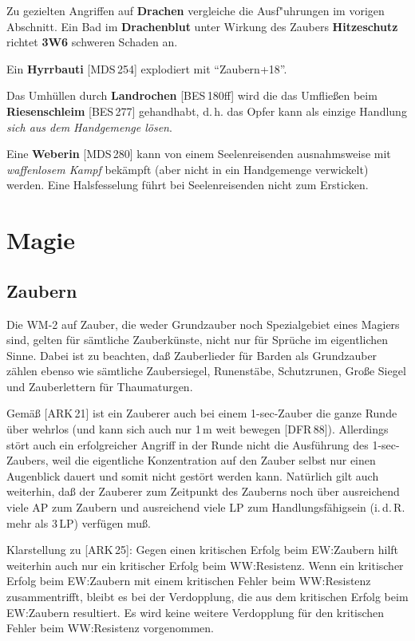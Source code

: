 \documentclass[10pt,a4paper,germanpar]{article}
\begin{document}
Zu gezielten Angriffen auf \textbf{Drachen} vergleiche die
Ausf"uhrungen im vorigen Abschnitt. Ein Bad im \textbf{Drachenblut}
unter Wirkung des Zaubers \textbf{Hitzeschutz} richtet \textbf{3W6}
schweren Schaden an.

Ein \textbf{Hyrrbauti} [MDS\,254] explodiert mit "`Zaubern+18"'.

Das Umhüllen durch \textbf{Landrochen} [BES\,180ff] wird die das
Umfließen beim \textbf{Riesenschleim} [BES\,277] gehandhabt,
d.\,h. das Opfer kann als einzige Handlung \emph{sich aus dem
  Handgemenge lösen}.

Eine \textbf{Weberin} [MDS\,280] kann von einem Seelenreisenden
ausnahmsweise mit \emph{waffenlosem Kampf} bekämpft (aber nicht
in ein Handgemenge verwickelt) werden. Eine Halsfesselung führt bei
Seelenreisenden nicht zum Ersticken.

\section{Magie}

\subsection{Zaubern}

Die WM-2 auf Zauber, die weder Grundzauber noch Spezialgebiet eines Magiers
sind, gelten für sämtliche Zauberkünste, nicht nur für Sprüche im eigentlichen
Sinne. Dabei ist zu beachten, daß Zauberlieder für Barden als Grundzauber
zählen ebenso wie sämtliche Zaubersiegel, Runenstäbe, Schutzrunen, Große
Siegel und Zauberlettern für Thaumaturgen.

Gemäß [ARK\,21] ist ein Zauberer auch bei einem 1-sec-Zauber die ganze Runde
über wehrlos (und kann sich auch nur 1\,m weit bewegen [DFR\,88]). Allerdings
stört auch ein erfolgreicher Angriff in der Runde nicht die Ausführung des
1-sec-Zaubers, weil die eigentliche Konzentration auf den Zauber selbst nur
einen Augenblick dauert und somit nicht gestört werden kann. Natürlich gilt
auch weiterhin, daß der Zauberer zum Zeitpunkt des Zauberns noch über
ausreichend viele AP zum Zaubern und ausreichend viele LP zum
Handlungsfähigsein (i.\,d.\,R. mehr als 3\,LP) verfügen muß.

Klarstellung zu [ARK\,25]: Gegen einen kritischen Erfolg beim EW:Zaubern
hilft weiterhin auch nur ein kritischer Erfolg beim WW:Resistenz. Wenn
ein kritischer Erfolg beim EW:Zaubern mit einem kritischen Fehler beim
WW:Resistenz zusammentrifft, bleibt es bei der Verdopplung, die aus
dem kritischen Erfolg beim EW:Zaubern resultiert. Es wird keine
weitere Verdopplung für den kritischen Fehler beim WW:Resistenz
vorgenommen.
\end{document}

